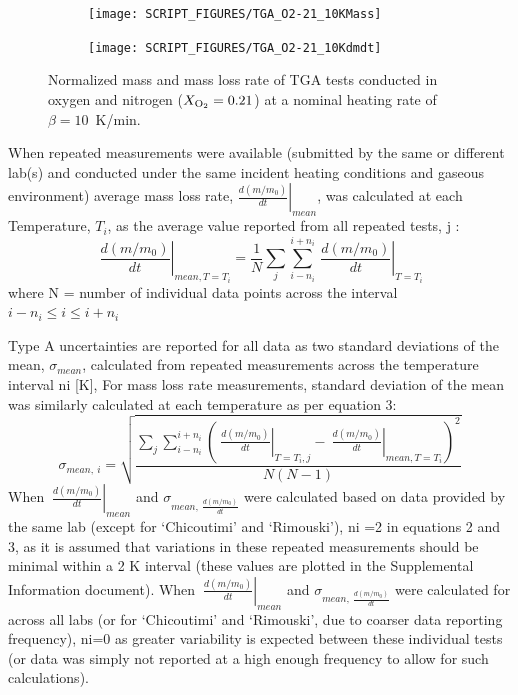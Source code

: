 \documentclass{book}
\begin{document}
\begin{figure}
\centering
\begin{subfigure}[b]{0.85\textwidth}
   \texttt{[image: SCRIPT\_FIGURES/TGA\_O2-21\_10KMass]}
   \caption{}
   \label{Fig:TGA_O2-21_10KMass}
\end{subfigure}

\begin{subfigure}[b]{0.85\textwidth}
   \texttt{[image: SCRIPT\_FIGURES/TGA\_O2-21\_10Kdmdt]}
   \caption{}
   \label{Fig:TGA_O2-21_10Kdmdt}
\end{subfigure}

  \caption{Normalized mass and mass loss rate of TGA tests conducted in oxygen and nitrogen ($X_{\rm O_2}=0.21$) at a nominal heating rate of $\beta=10$~K/min.}
  \label{Fig:TGA_O2-21_10K}
\end{figure}



When repeated measurements were available (submitted by the same or different lab(s) and conducted under the same incident heating conditions and gaseous environment) average mass loss rate, $\left.\frac{d\left(m/m_0\right)}{dt}\right|_{mean}$, was calculated at each Temperature, $T_i$, as the average value reported from all repeated tests, j :
\begin{equation}
\left.\ \frac{d\left(m/m_0\right)}{dt}\right|_{mean,T=T_i}=\frac{1}{N}\sum_{j}\sum_{i-n_i}^{i+n_i}\left.\ \frac{d\left(m/m_0\right)}{dt}\right|_{T=T_i}
\end{equation}
where N = number of individual data points across the interval $i-n_i\le i\le i+n_i$

Type A uncertainties are reported for all data as two standard deviations of the mean, $\sigma_{mean}$, calculated from repeated measurements across the temperature interval ni [K], For mass loss rate measurements, standard deviation of the mean was similarly calculated at each temperature as per equation 3:
\begin{equation}
  \sigma_{mean,\ i}=\sqrt{\frac{\sum_{j}\sum_{i-n_i}^{i+n_i}\left(\left.\ \frac{d\left(m/m_0\right)}{dt}\right|_{T=T_i,j}-\left.\ \frac{d\left(m/m_0\right)}{dt}\right|_{mean,T=T_i}\right)^2}{N\left(N-1\right)}}
\end{equation}
When $\left.\ \frac{d\left(m/m_0\right)}{dt}\right|_{mean}$ and $\sigma_{mean,\ \frac{d\left(m/m_0\right)}{dt}}$ were calculated based on data provided by the same lab (except for ‘Chicoutimi’ and ‘Rimouski’), ni =2 in equations 2 and 3, as it is assumed that variations in these repeated measurements should be minimal within a 2 K interval (these values are plotted in the Supplemental Information document). When $\left.\ \frac{d\left(m/m_0\right)}{dt}\right|_{mean}$ and $\sigma_{mean,\ \frac{d\left(m/m_0\right)}{dt}}$  were calculated for across all labs (or for ‘Chicoutimi’ and ‘Rimouski’, due to coarser data reporting frequency), ni=0 as greater variability is expected between these individual tests (or data was simply not reported at a high enough frequency to allow for such calculations).
\end{document}

